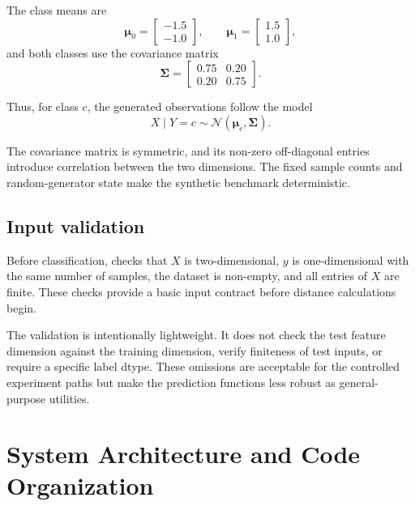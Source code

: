 \documentclass[11pt,a4paper]{article}
\newcommand{\code}[1]{\texttt{\detokenize{#1}}}
\begin{document}
The class means are
\begin{equation}
 \boldsymbol{\mu}_0=
 \begin{bmatrix}
 -1.5\\-1.0
 \end{bmatrix},
 \qquad
 \boldsymbol{\mu}_1=
 \begin{bmatrix}
 1.5\\1.0
 \end{bmatrix},
\end{equation}
and both classes use the covariance matrix
\begin{equation}
 \boldsymbol{\Sigma}=
 \begin{bmatrix}
 0.75 & 0.20\\
 0.20 & 0.75
 \end{bmatrix}.
\end{equation}

Thus, for class $c$, the generated observations follow the model
\begin{equation}
 X\mid Y=c \sim \mathcal{N}(\boldsymbol{\mu}_c,\boldsymbol{\Sigma}).
\end{equation}

The covariance matrix is symmetric, and its non-zero off-diagonal entries introduce correlation between the two dimensions. The fixed sample counts and random-generator state make the synthetic benchmark deterministic.

\subsection{Input validation}

Before classification, \code{_validate_xy} checks that $X$ is two-dimensional, $y$ is one-dimensional with the same number of samples, the dataset is non-empty, and all entries of $X$ are finite. These checks provide a basic input contract before distance calculations begin.

The validation is intentionally lightweight. It does not check the test feature dimension against the training dimension, verify finiteness of test inputs, or require a specific label dtype. These omissions are acceptable for the controlled experiment paths but make the prediction functions less robust as general-purpose utilities.

\section{System Architecture and Code Organization}
\end{document}
